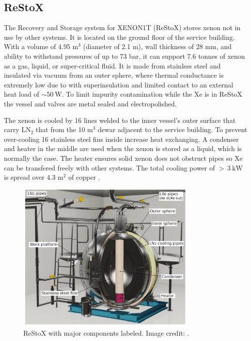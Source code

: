 \subsection{ReStoX}
\label{subsec:xenon1t_restox}
The Recovery and Storage system for XENON1T (ReStoX) stores xenon not in use by other systems.  It is located on the ground floor of the
service building.  With a volume of 4.95 m$^{3}$
(diameter of 2.1 m), wall thickness of 28 mm, and ability to withstand pressures of up to 73 bar, it can support 7.6 tonnes of
xenon
as a gas, liquid, or super-critical fluid.  It is made from stainless steel and insulated via vacuum from an outer sphere, where
thermal conductance is extremely low due to with superinsulation and limited contact to an external heat load of
${\sim}50\ \mathrm{W}$.  To limit
impurity contamination while the Xe is in ReStoX the vessel and valves are metal sealed and electropolished.

The xenon is cooled by 16 lines welded to the inner vessel's outer surface that carry LN$_2$ that from the 10 m$^3$ dewar adjacent to the
service building.  To prevent over-cooling 16 stainless steel fins inside increase heat
exchanging.  A condenser and heater in the middle are used when the xenon is stored as a liquid, which is normally the case.  The heater
ensures solid xenon does not obstruct pipes so Xe can be transfered freely with other systems.  The total cooling power of
${>}\, 3\ \mathrm{kW}$ is spread over 4.3 m$^2$ of copper .

\begin{figure}
\centering
\includegraphics[width=0.8\textwidth]{ReStoX}
\caption{ReStoX with major components labeled.  Image credit: .}
\label{fig:xenon1t_restox_pic}
\end{figure}

